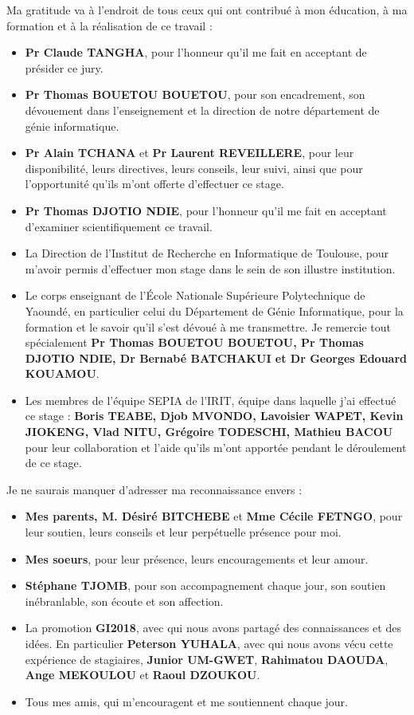 \begin{SingleSpace}
Ma gratitude va à l'endroit de tous ceux qui ont contribué à mon éducation, à ma formation et à la réalisation de ce travail :

\begin{itemize}
	\item \textbf{Pr Claude TANGHA}, pour l’honneur qu’il me fait en acceptant de présider ce jury.
    \item \textbf{Pr Thomas BOUETOU BOUETOU}, pour son encadrement, son dévouement dans l'enseignement et la direction de notre département de génie informatique.
    \item \textbf{Pr Alain TCHANA} et \textbf{Pr Laurent REVEILLERE}, pour leur disponibilité, leurs directives, leurs conseils, leur suivi, ainsi que pour l’opportunité qu’ils m’ont offerte d’effectuer ce stage.
    \item \textbf{Pr Thomas DJOTIO NDIE}, pour l’honneur qu’il me fait en acceptant d’examiner scientifiquement ce travail. 
    \item La Direction de l’Institut de Recherche en Informatique de Toulouse, pour m’avoir permis d’effectuer mon stage dans le sein de son illustre institution.
    \item Le corps enseignant de l’École Nationale Supérieure Polytechnique de Yaoundé, en particulier celui du Département de Génie Informatique, pour la formation et le savoir qu’il s’est dévoué à me transmettre. Je remercie tout spécialement \textbf{Pr Thomas BOUETOU BOUETOU, Pr Thomas DJOTIO NDIE, Dr Bernabé BATCHAKUI et Dr Georges Edouard KOUAMOU}.
    \item Les membres de l’équipe SEPIA de l’IRIT, équipe dans laquelle j’ai effectué ce \break stage : \textbf{Boris TEABE, Djob MVONDO, Lavoisier WAPET, Kevin JIOKENG, Vlad NITU, Grégoire TODESCHI, Mathieu BACOU} pour leur collaboration et l’aide qu’ils m’ont apportée pendant le déroulement de ce stage.
\end{itemize}

\noindent Je ne saurais manquer d'adresser ma reconnaissance envers : 
\begin{itemize}
	\item \textbf{Mes parents, M. Désiré BITCHEBE} et \textbf{Mme Cécile FETNGO}, pour leur soutien, leurs conseils et leur perpétuelle présence pour moi.
	\item \textbf{Mes soeurs}, pour leur présence, leurs encouragements et leur amour.
    \item \textbf{Stéphane TJOMB}, pour son accompagnement chaque jour, son soutien inébranlable, son écoute et son affection.
    \item La promotion \textbf{GI2018}, avec qui nous avons partagé des connaissances et des idées. En particulier \textbf{Peterson YUHALA}, avec qui nous avons vécu cette expérience de stagiaires, \textbf{Junior UM-GWET}, \textbf{Rahimatou DAOUDA}, \textbf{Ange MEKOULOU} et \textbf{Raoul DZOUKOU}. 
    \item Tous mes amis, qui m’encouragent et me soutiennent chaque jour.
\end{itemize}
\end{SingleSpace}
\clearpage
